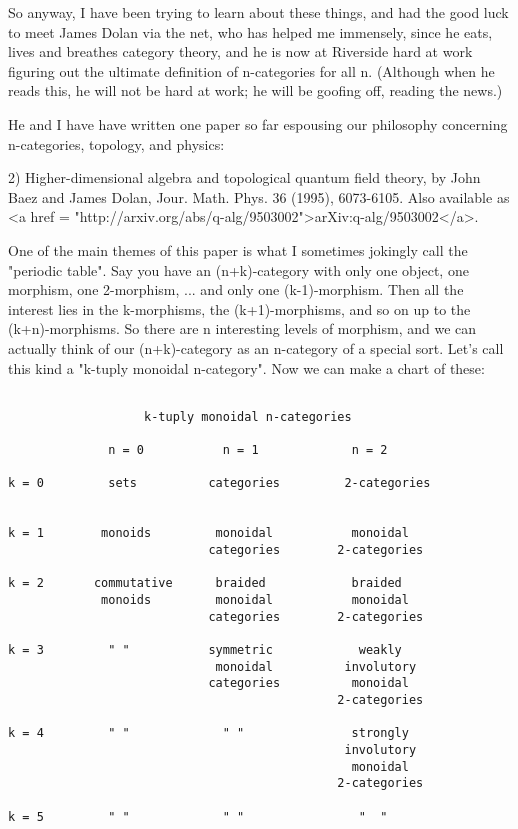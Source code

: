 So anyway, I have been trying to learn about these things, and
had the good luck to meet James Dolan via the net, who has
helped me immensely, since he eats, lives and breathes category theory,
and he is now at Riverside hard at work figuring out the ultimate 
definition of n-categories for all n.   (Although when he reads this,
he will not be hard at work; he will be goofing off, reading the news.)

He and I have have written one paper so far espousing our philosophy
concerning n-categories, topology, and physics:

2) Higher-dimensional algebra and topological quantum field theory,
by John Baez and James Dolan, Jour. Math. Phys. 36 (1995), 6073-6105. 
Also available as
<a href = "http://arxiv.org/abs/q-alg/9503002">arXiv:q-alg/9503002</a>.

One of the main themes of this paper is what I sometimes jokingly call
the "periodic table".  Say you have an (n+k)-category with only one
object, one morphism, one 2-morphism, ... and only one (k-1)-morphism.
Then all the interest lies in the k-morphisms, the (k+1)-morphisms,
and so on up to the (k+n)-morphisms.  So there are n interesting
levels of morphism, and we can actually think of our (n+k)-category as
an n-category of a special sort.  Let's call this kind a "k-tuply
monoidal n-category".  Now we can make a chart of these:



\begin{verbatim}

                   k-tuply monoidal n-categories 

              n = 0           n = 1             n = 2

k = 0         sets          categories         2-categories
     

k = 1        monoids         monoidal           monoidal
                            categories        2-categories

k = 2       commutative      braided            braided
             monoids         monoidal           monoidal
                            categories        2-categories 

k = 3         " "           symmetric            weakly
                             monoidal          involutory
                            categories          monoidal
                                              2-categories

k = 4         " "             " "               strongly 
                                               involutory
                                                monoidal
                                              2-categories

k = 5         " "             " "                "  "
\end{verbatim}
    

